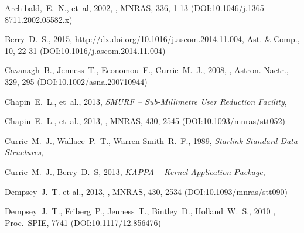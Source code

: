 \documentclass[11pt,oneside,chapters]{starlink}
\begin{document}
\newpage

\newpage

\newpage

\newpage

\newpage

\newpage

\newpage

\newpage

\newpage



\begin{thebibliography}{}

Archibald,~E.~N., et~al, 2002, , MNRAS, 336, 1-13
(DOI:10.1046/j.1365-8711.2002.05582.x)

Berry~D.~S.,  2015,
{http://dx.doi.org/10.1016/j.ascom.2014.11.004},
Ast. \& Comp., 10, 22-31 (DOI:10.1016/j.ascom.2014.11.004)

Cavanagh~B., Jenness~T., Economou~F., Currie~M.~J., 2008,
, Astron. Nactr., 329, 295
(DOI:10.1002/asna.200710944)

Chapin~E.~L., et~al., 2013, \textit{SMURF -- Sub-Millimetre User Reduction
Facility}, 

Chapin~E.~L., et~al., 2013,
,
MNRAS, 430, 2545 (DOI:10.1093/mnras/stt052)

Currie~M.~J., Wallace~P.~T., Warren-Smith~R.~F., 1989,
\textit{Starlink Standard Data Structures}, 

Currie~M.~J., Berry~D.~S, 2013, \textit{KAPPA -- Kernel Application Package},

Dempsey~J.~T. et al., 2013, ,
MNRAS, 430, 2534 (DOI:10.1093/mnras/stt090)

Dempsey~J.~T., Friberg~P., Jenness~T., Bintley~D., Holland~W.~S., 2010
,
Proc.\ SPIE, 7741 (DOI:10.1117/12.856476)


\end{thebibliography}
\end{document}
